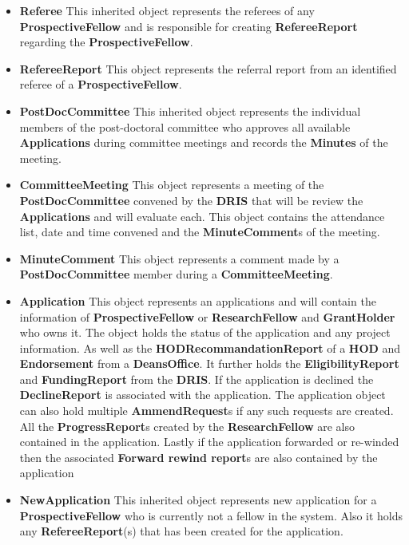 \documentclass[12pt]{article}
\begin{document}
\begin{itemize}
\item \textbf{Referee}
This inherited object represents the referees of any \textbf{ProspectiveFellow} and is responsible for creating \textbf{RefereeReport} regarding the \textbf{ProspectiveFellow}.

\item \textbf{RefereeReport}
This object represents the referral report from an identified referee of a \textbf{ProspectiveFellow}.

\item \textbf{PostDocCommittee}
This inherited object represents the individual members of the post-doctoral committee who approves all available \textbf{Applications} during committee meetings and records the \textbf{Minutes} of the meeting.

\item \textbf{CommitteeMeeting}
This object represents a meeting of the \textbf{PostDocCommittee} convened by the \textbf{DRIS} that will be review the \textbf{Applications} and will evaluate each. This object contains the attendance list, date and time convened and the \textbf{MinuteComment}s of the meeting.

\item \textbf{MinuteComment}
This object represents a comment made by a \textbf{PostDocCommittee} member during a \textbf{CommitteeMeeting}.

\item \textbf{Application}
This object represents an applications and will contain the information of \textbf{ProspectiveFellow} or \textbf{ResearchFellow} and \textbf{GrantHolder} who owns it. The object holds the status of the application and any project information. As well as the \textbf{HODRecommandationReport} of a \textbf{HOD} and \textbf{Endorsement} from a \textbf{DeansOffice}. It further holds the \textbf{EligibilityReport} and \textbf{FundingReport} from the \textbf{DRIS}. If the application is declined the \textbf{DeclineReport} is associated with the application. The application object can also hold multiple \textbf{AmmendRequest}s if any such requests are created. All the \textbf{ProgressReport}s created by the \textbf{ResearchFellow} are also contained in the application. Lastly if the application forwarded or re-winded then the associated \textbf{Forward rewind report}s are also contained by the application 

\item \textbf{NewApplication}
This inherited object represents new application for a \textbf{ProspectiveFellow} who is currently not a fellow in the system. Also it holds any \textbf{RefereeReport}(s) that has been created for the application.


\end{itemize}
\end{document}
